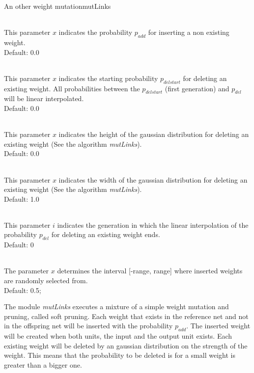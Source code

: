 \begin{moduledoc}{An other weight mutation}{mutLinks}

\item[\KeyWord{probadd} \optParam{$p_{add}$}]~\\
This parameter $x$ indicates the probability $p_{add}$ for inserting a
non existing weight.\\
Default: 0.0

\item[\KeyWord{probdelStart} \optParam{$p_{delstart}$}]~\\
This parameter $x$ indicates the starting probability $p_{delstart}$ for deleting an
existing weight. All probabilities between the $p_{delstart}$ (first generation)
and $p_{del}$ will be linear interpolated.\\
Default: 0.0

\item[\KeyWord{probdel} \optParam{$p_{del}$}]~\\
This parameter $x$ indicates the height  of the gaussian distribution for deleting an
existing weight (See the algorithm {\it mutLinks}).\\
Default: 0.0

\item[\KeyWord{sigmadel} \optParam{$x$}]~\\
This parameter $x$ indicates the width  of the gaussian distribution for deleting an
existing weight (See the algorithm {\it mutLinks}).\\
Default: 1.0


\item[\KeyWord{probdelEndGen} \optParam{$i$}]~\\
This parameter $i$ indicates the generation in which the linear interpolation of the 
probability $p_{del}$ for deleting an existing weight ends.\\
Default: 0

\item[\KeyWord{initRange} \optParam{f}]~\\
The parameter $x$ determines the interval  [-range, range] where
inserted weights are randomly selected from.\\
Default: 0.5;

\end{moduledoc}

The module {\it mutLinks} executes a mixture of a simple weight mutation 
and pruning, called soft pruning. 
Each weight that exists in the reference net and not in the offspring net
will be inserted with the probability $p_{add}$.
The inserted weight will be created when both units, the input and the output unit 
exists.
Each existing weight will be deleted by an gaussian distribution on the strength of the 
weight. 
This means that the probability to be deleted is for a small weight is greater than
a bigger one.

